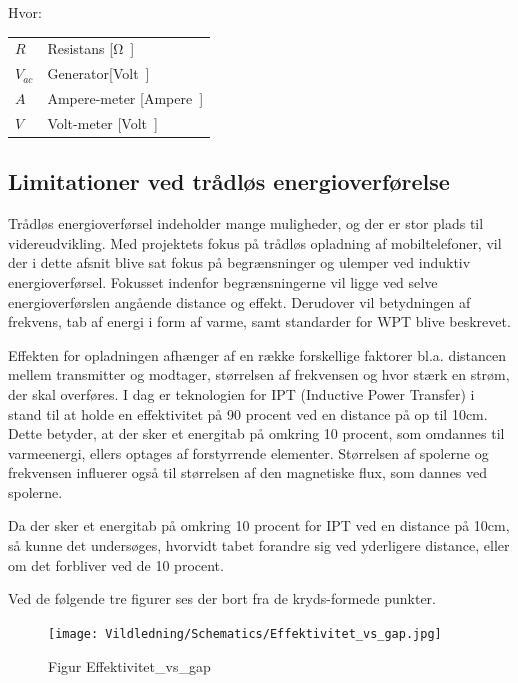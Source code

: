 Hvor:
\begin{table}[H]
	\begin{tabular}{l|l}
	$R$     & Resistans [\si \ohm] \\
	$V_{ac}$ 	   &  Generator[\si Volt] \\
	$A$ 	   & Ampere-meter [\si Ampere] \\
	$V$			& Volt-meter [\si Volt]
	\end{tabular}
\end{table}

\subsection{Limitationer ved trådløs energioverførelse }
Trådløs energioverførsel indeholder mange muligheder, og der er stor plads til videreudvikling. Med projektets fokus på trådløs opladning af mobiltelefoner, vil der i dette afsnit blive sat fokus på begrænsninger og ulemper ved induktiv energioverførsel. Fokusset indenfor begrænsningerne vil ligge ved selve energioverførslen angående distance og effekt. Derudover vil betydningen af frekvens, tab af energi i form af varme, samt standarder for WPT blive beskrevet.

Effekten for opladningen afhænger af en række forskellige faktorer bl.a. distancen mellem transmitter og modtager, størrelsen af frekvensen og hvor stærk en strøm, der skal overføres. I dag er teknologien for IPT (Inductive Power Transfer) i stand til at holde en effektivitet på 90 procent ved en distance på op til 10cm. Dette betyder, at der sker et energitab på omkring 10 procent, som omdannes til varmeenergi, ellers optages af forstyrrende elementer. Størrelsen af spolerne og frekvensen influerer også til størrelsen af den magnetiske flux, som dannes ved spolerne.

Da der sker et energitab på omkring 10 procent for IPT ved en distance på 10cm, så kunne det undersøges, hvorvidt tabet forandre sig ved yderligere distance, eller om det forbliver ved de 10 procent.

Ved de følgende tre figurer ses der bort fra de kryds-formede punkter.

\begin{figure}[H]
\centering
\texttt{[image: Vildledning/Schematics/Effektivitet\_vs\_gap.jpg]}
\caption{Figur Effektivitet_vs_gap}
\end{figure}

